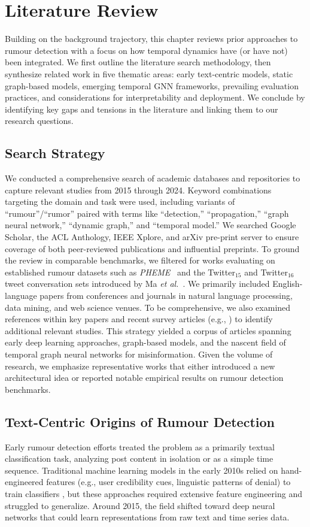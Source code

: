 \documentclass{cshonours}
\begin{document}
\chapter{Literature Review}\label{chap:literature}

Building on the background trajectory, this chapter reviews prior approaches to rumour detection with a focus on how temporal dynamics have (or have not) been integrated. We first outline the literature search methodology, then synthesize related work in five thematic areas: early text-centric models, static graph-based models, emerging temporal GNN frameworks, prevailing evaluation practices, and considerations for interpretability and deployment. We conclude by identifying key gaps and tensions in the literature and linking them to our research questions.

\section{Search Strategy}
We conducted a comprehensive search of academic databases and repositories to capture relevant studies from 2015 through 2024. Keyword combinations targeting the domain and task were used, including variants of “rumour”/“rumor” paired with terms like “detection,” “propagation,” “graph neural network,” “dynamic graph,” and “temporal model.” We searched Google Scholar, the ACL Anthology, IEEE Xplore, and arXiv pre-print server to ensure coverage of both peer-reviewed publications and influential preprints. To ground the review in comparable benchmarks, we filtered for works evaluating on established rumour datasets such as \emph{PHEME}~\cite{zubiaga2016pheme} and the Twitter$_{15}$ and Twitter$_{16}$ tweet conversation sets introduced by Ma \textit{et al.}~\cite{ma2017rumordatasets}. We primarily included English-language papers from conferences and journals in natural language processing, data mining, and web science venues. To be comprehensive, we also examined references within key papers and recent survey articles (e.g., \cite{zhang2024graph}) to identify additional relevant studies. This strategy yielded a corpus of articles spanning early deep learning approaches, graph-based models, and the nascent field of temporal graph neural networks for misinformation. Given the volume of research, we emphasize representative works that either introduced a new architectural idea or reported notable empirical results on rumour detection benchmarks.

\section{Text-Centric Origins of Rumour Detection}
Early rumour detection efforts treated the problem as a primarily textual classification task, analyzing post content in isolation or as a simple time sequence. Traditional machine learning models in the early 2010s relied on hand-engineered features (e.g., user credibility cues, linguistic patterns of denial) to train classifiers \cite{castillo2011credibility, kwon2013rumor}, but these approaches required extensive feature engineering and struggled to generalize. Around 2015, the field shifted toward deep neural networks that could learn representations from raw text and time series data. 
\end{document}
